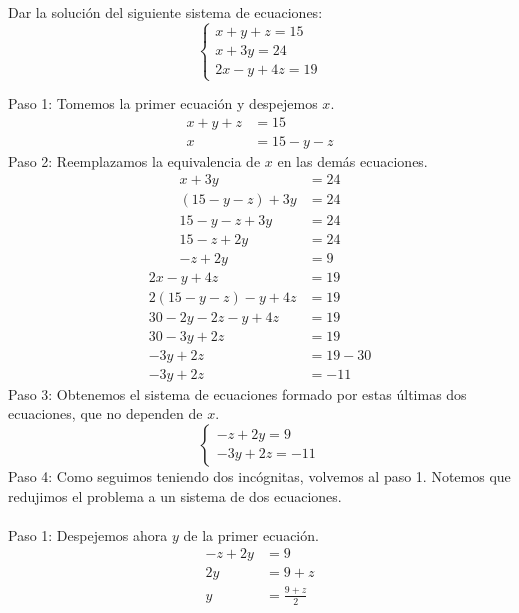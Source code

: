 \documentclass{article}
\begin{document}
\begin{ejemplo}
Dar la solución del siguiente sistema de ecuaciones:
	\begin{equation}
		\begin{cases}
		x+y+z=15\\
		x+3y=24\nonumber\\
		2x-y+4z=19
		\end{cases}
	\end{equation}
\begin{normalsize}
Paso 1: Tomemos la primer ecuación y despejemos $x$.
\begin{align}
	x+y+z&=15\nonumber\\
	x&=15-y-z\nonumber
\end{align}
Paso 2: Reemplazamos la equivalencia de $x$ en las demás ecuaciones.
\begin{align}
	x+3y&=24\nonumber\\
	(15-y-z)+3y&=24\nonumber\\
	15-y-z+3y&=24\nonumber\\
	15-z+2y&=24\nonumber\\
	-z+2y&=9\nonumber
\end{align}
\begin{align}
	2x-y+4z&=19\nonumber\\
	2(15-y-z)-y+4z&=19\nonumber\\
	30-2y-2z-y+4z&=19\nonumber\\
	30-3y+2z&=19\nonumber\\
	-3y+2z&=19-30\nonumber\\
	-3y+2z&=-11\nonumber
\end{align}
Paso 3: Obtenemos el sistema de ecuaciones formado por estas últimas dos ecuaciones, que no dependen de $x$.
	\begin{equation}
		\begin{cases}
		-z+2y=9\nonumber\\
		-3y+2z=-11
		\end{cases}
	\end{equation}
Paso 4: Como seguimos teniendo dos incógnitas, volvemos al paso 1. Notemos que redujimos el problema a un sistema de dos ecuaciones.\\\\
Paso 1: Despejemos ahora $y$ de la primer ecuación.
\begin{align}
	-z+2y&=9\nonumber\\
	2y&=9+z\nonumber\\
	y&=\frac{9+z}{2}\nonumber
\end{align}

\end{normalsize}
\end{ejemplo}
\end{document}
